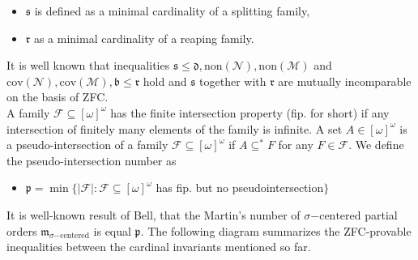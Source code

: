\documentclass[a4paper]{amsart}
\newcommand{\bbb}{\mathfrak{b}}
\newcommand{\ddd}{\mathfrak{d}}
\newcommand{\sss}{\mathfrak{s}}
\newcommand{\rrr}{\mathfrak{r}}
\newcommand{\ppp}{\mathfrak{p}}
\newcommand{\mmm}{\mathfrak{m}}
\newcommand{\Meager}{\mathcal{M}}
\newcommand{\Null}{\mathcal{N}}
\newcommand{\cov}{\mathrm{cov}}
\newcommand{\non}{\mathrm{non}}
\begin{document}
\begin{itemize}
    \item[--] $\sss$ is defined as a minimal cardinality of a splitting family,
    \item[--] $\rrr$ as a minimal cardinality of a reaping family.
\end{itemize}
It is well known that inequalities $\sss\leq\ddd,\non(\Null),\non(\Meager)$ and $\cov(\Null),\cov(\Meager),\bbb\leq\rrr$ hold and $\sss$ together with $\rrr$ are mutually incomparable on the basis of ZFC.\\
A family $\mathcal{F}\subseteq[\omega]^{\omega}$ has the finite intersection property (fip. for short) if any intersection of finitely many elements of the family is infinite. A set $A\in[\omega]^{\omega}$ is a pseudo-intersection of a family $\mathcal{F}\subseteq[\omega]^{\omega}$ if $A\subseteq^{*}F$ for any $F\in \mathcal{F}$. We define the pseudo-intersection number as
\begin{itemize}
    \item[--] $\ppp=\min\{|\mathcal{F}|:\mathcal{F}\subseteq[\omega]^{\omega}$ has fip. but no pseudointersection$\}$
\end{itemize}
It is well-known result of Bell, that the Martin's number of $\sigma\mathrm{-centered}$ partial orders $\mmm_{\sigma\mathrm{-centered}}$ is equal $\ppp$. The following diagram summarizes the ZFC-provable inequalities between the cardinal invariants mentioned so far.
\begin{center}
\end{center}
\end{document}
